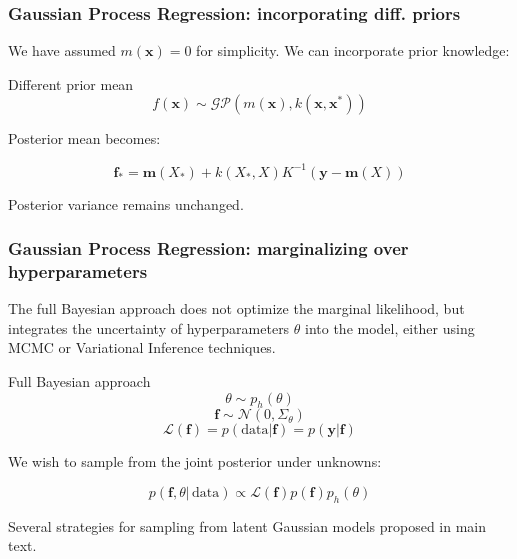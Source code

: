 \documentclass[10pt,usenames,dvipsnames]{beamer}
\begin{document}
		\begin{frame}
			\frametitle{Gaussian Process Regression: incorporating diff. priors}
			We have assumed $m(\boldsymbol{x}) = 0$ for simplicity. We can incorporate prior knowledge:
			
			\begin{block}{Different prior mean}
				\begin{equation}
				f(\boldsymbol{x}) \sim \mathcal{G}\mathcal{P}\left(m(\boldsymbol{x}), k(\boldsymbol{x}, \boldsymbol{x^*})\right)
				\end{equation}
				
				Posterior mean becomes:
				
				\begin{equation}
				\boldsymbol{f}_* = \boldsymbol{m}(X_*) + k(X_*, X)K^{-1}\left(\boldsymbol{y} - \boldsymbol{m}(X)\right) 
				\end{equation}
				
				Posterior variance remains unchanged.
			\end{block}
		\end{frame}
		
		\begin{frame}
			\frametitle{Gaussian Process Regression: marginalizing over hyperparameters}
			The full Bayesian approach does not optimize the marginal likelihood, but integrates the uncertainty of hyperparameters $\theta$ into the model, either using MCMC or Variational Inference techniques.
			
			\begin{block}{Full Bayesian approach}
				\begin{equation}
				\theta \sim p_{h}(\theta)
				\end{equation}
				\begin{equation}
				\boldsymbol{f} \sim \mathcal{N}(0, \Sigma_\theta)
				\end{equation}
				\begin{equation}
				\mathcal{L(\boldsymbol{f})} = p(\mathrm{data}|\boldsymbol{f}) = p(\boldsymbol{y}|\boldsymbol{f})
				\end{equation}
				
				We wish to sample from the joint posterior under unknowns:
				
				\begin{equation}
				p(\boldsymbol{f}, \theta|\, \mathrm{data}) \propto \mathcal{L}(\boldsymbol{f})p(\boldsymbol{f}) p_h(\theta)
				\end{equation}
			\end{block}
			Several strategies for sampling from latent Gaussian models proposed in main text.	
		\end{frame}
		
\end{document}
